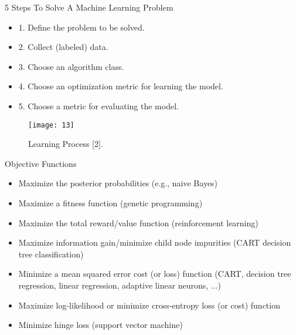 \documentclass[compress,oilve]{beamer}
\begin{document}
\begin{frame}{5 Steps To Solve A Machine Learning Problem}
\begin{itemize}
\item 1. Define the problem to be solved.
\item 2. Collect (labeled) data.
\item 3. Choose an algorithm class.
\item 4. Choose an optimization metric for learning the model.
\item 5. Choose a metric for evaluating the model.
\end{itemize}
\begin{figure}
 \centering
 \texttt{[image: 13]}  
 \caption{Learning Process [2].}
\end{figure}
\end{frame}

\begin{frame}{Objective Functions}
\begin{itemize}
\item Maximize the posterior probabilities (e.g., naive Bayes)
\item Maximize a fitness function (genetic programming)
\item Maximize the total reward/value function (reinforcement learning)
\item Maximize information gain/minimize child node impurities (CART decision tree classification)
\item Minimize a mean squared error cost (or loss) function (CART, decision tree regression, linear regression, adaptive linear neurons, ...)
\item Maximize log-likelihood or minimize cross-entropy loss (or cost) function
\item Minimize hinge loss (support vector machine)
\end{itemize}
\end{frame}
\end{document}
